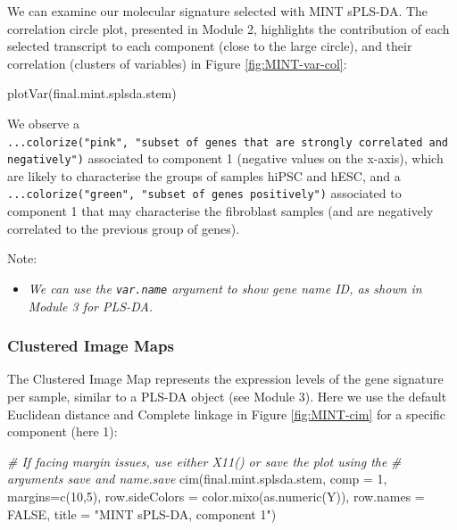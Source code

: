 \documentclass[
]{book}
\newenvironment{Shaded}{\begin{snugshade}}{\end{snugshade}}
\newcommand{\AttributeTok}[1]{\textcolor[rgb]{0.77,0.63,0.00}{#1}}
\newcommand{\CommentTok}[1]{\textcolor[rgb]{0.56,0.35,0.01}{\textit{#1}}}
\newcommand{\ConstantTok}[1]{\textcolor[rgb]{0.00,0.00,0.00}{#1}}
\newcommand{\DecValTok}[1]{\textcolor[rgb]{0.00,0.00,0.81}{#1}}
\newcommand{\FunctionTok}[1]{\textcolor[rgb]{0.00,0.00,0.00}{#1}}
\newcommand{\NormalTok}[1]{#1}
\newcommand{\StringTok}[1]{\textcolor[rgb]{0.31,0.60,0.02}{#1}}
\providecommand{\tightlist}{%
  \setlength{\itemsep}{0pt}\setlength{\parskip}{0pt}}
\begin{document}
We can examine our molecular signature selected with MINT sPLS-DA. The correlation circle plot, presented in Module 2, highlights the contribution of each selected transcript to each component (close to the large circle), and their correlation (clusters of variables) in Figure \ref{fig:MINT-var-col}:

\begin{Shaded}
\begin{Highlighting}[]
\FunctionTok{plotVar}\NormalTok{(final.mint.splsda.stem)}
\end{Highlighting}
\end{Shaded}



We observe a \texttt{...colorize("pink",\ "subset\ of\ genes\ that\ are\ strongly\ correlated\ and\ negatively")} associated to component 1 (negative values on the x-axis), which are likely to characterise the groups of samples hiPSC and hESC, and a \texttt{...colorize("green",\ "subset\ of\ genes\ positively")} associated to component 1 that may characterise the fibroblast samples (and are negatively correlated to the previous group of genes).

Note:

\begin{itemize}
\tightlist
\item
  \emph{We can use the \texttt{var.name} argument to show gene name ID, as shown in Module 3 for PLS-DA.}
\end{itemize}

\hypertarget{clustered-image-maps}{%
\subsubsection{Clustered Image Maps}\label{clustered-image-maps}}

The Clustered Image Map represents the expression levels of the gene signature per sample, similar to a PLS-DA object (see Module 3). Here we use the default Euclidean distance and Complete linkage in Figure \ref{fig:MINT-cim} for a specific component (here 1):

\begin{Shaded}
\begin{Highlighting}[]
\CommentTok{\# If facing margin issues, use either X11() or save the plot using the}
\CommentTok{\# arguments save and name.save}
\FunctionTok{cim}\NormalTok{(final.mint.splsda.stem, }\AttributeTok{comp =} \DecValTok{1}\NormalTok{, }\AttributeTok{margins=}\FunctionTok{c}\NormalTok{(}\DecValTok{10}\NormalTok{,}\DecValTok{5}\NormalTok{), }
    \AttributeTok{row.sideColors =} \FunctionTok{color.mixo}\NormalTok{(}\FunctionTok{as.numeric}\NormalTok{(Y)), }\AttributeTok{row.names =} \ConstantTok{FALSE}\NormalTok{,}
    \AttributeTok{title =} \StringTok{"MINT sPLS{-}DA, component 1"}\NormalTok{)}
\end{Highlighting}
\end{Shaded}
\end{document}
